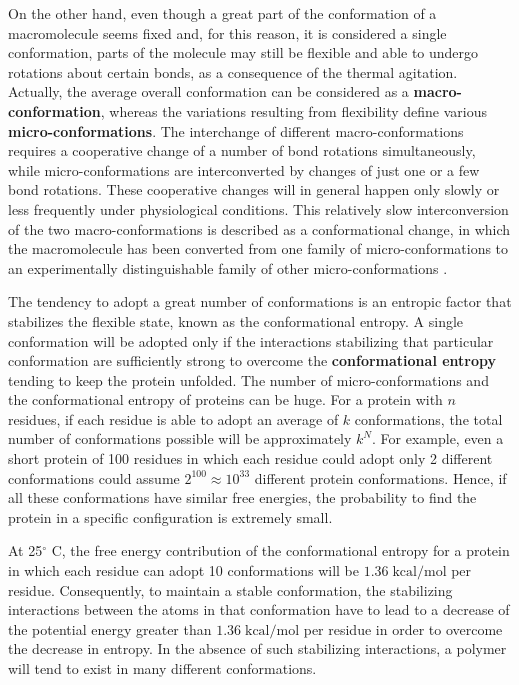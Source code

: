 On the other hand, even though a great part of the conformation of a macromolecule seems fixed and, for this reason, it is considered a single conformation, parts of the molecule may still be flexible and able to undergo rotations about certain bonds, as a consequence of the thermal agitation. Actually, the average overall conformation can be considered as a \textbf{macro-conformation}, whereas the variations resulting from flexibility define various \textbf{micro-conformations}. The interchange of different macro-conformations requires a cooperative change of a number of bond rotations simultaneously, while micro-conformations are interconverted by changes of just one or a few bond rotations. These cooperative changes will in general happen only slowly or less frequently under physiological conditions. This relatively slow interconversion of the two macro-conformations is described as a conformational change, in which the macromolecule has been converted from one family of micro-conformations to an experimentally distinguishable family of other micro-conformations
\cite{creighton2010biophysical}.


The tendency to adopt a great number of conformations is an entropic factor that stabilizes the flexible state, known as the conformational entropy.
A single conformation will be adopted only if the interactions stabilizing that particular conformation are sufficiently strong to overcome the \textbf{conformational entropy} tending to keep the protein unfolded. The number of micro-conformations and the conformational entropy of proteins can be huge. For a protein with $n$ residues, if each residue is able to adopt an average of $k$ conformations, the total number of conformations possible will be approximately $k^N$. For example, even a short protein of 100 residues in which each residue could adopt only 2 different conformations could assume $2^{100} \approx 10^{33}$ different protein conformations. Hence, if all these conformations have similar free energies, the probability to find the protein in a specific configuration is extremely small. 

At 25$^\circ$ C, the free energy contribution of the conformational entropy for a protein in which each residue can adopt 10 conformations will be $1.36 \;\text{kcal}/\text{mol}$ per residue. Consequently, to maintain a stable conformation, the stabilizing interactions between the atoms in that conformation have to lead to a decrease of the potential energy greater than $1.36 \;\text{kcal}/\text{mol}$ per residue in order to overcome the decrease in entropy. In the absence of such stabilizing interactions, a polymer will tend to exist in many different conformations. 

